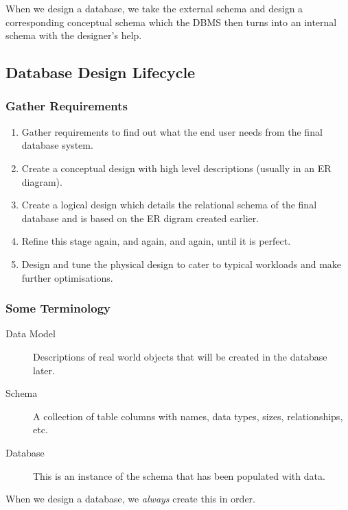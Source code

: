 When we design a database, we take the external schema and design a corresponding conceptual schema which the DBMS then turns into an internal schema with the designer's help.

\subsection{Database Design Lifecycle}\label{sub:database_design_lifecycle}

\subsubsection{Gather Requirements}\label{ssub:dsr_db_gather_requirements}

\begin{enumerate}
    \item Gather requirements to find out what the end user needs from the final database system.
    \item Create a conceptual design with high level descriptions (usually in an ER diagram).
    \item Create a logical design which details the relational schema of the final database and is based on the ER digram created earlier.
    \item Refine this stage again, and again, and again, until it is perfect.
    \item Design and tune the physical design to cater to typical workloads and make further optimisations.
\end{enumerate}

\subsubsection{Some Terminology}\label{ssub:some_terminology}

\begin{description}
    \item[Data Model] Descriptions of real world objects that will be created in the database later.
    \item[Schema] A collection of table columns with names, data types, sizes, relationships, etc.
    \item[Database] This is an instance of the schema that has been populated with data.
\end{description}

\begin{note}
    When we design a database, we \emph{always} create this in order.
\end{note}

